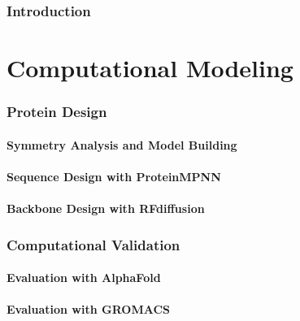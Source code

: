 \documentclass[12pt]{article}
\begin{document}
\tableofcontents
\clearpage

\section{Introduction}\label{ch:introduction}

\FloatBarrier

% 
\clearpage
\part{Computational Modeling}
\section{Protein Design}
\subsection{Symmetry Analysis and Model Building}\label{ch:symmetry}

\FloatBarrier

\subsection{Sequence Design with ProteinMPNN}\label{ch:pmpnn}

\FloatBarrier

\subsection{Backbone Design with RFdiffusion}\label{ch:rfdiffusion}

\FloatBarrier

\section{Computational Validation}
\subsection{Evaluation with AlphaFold}\label{ch:alphafold}

\FloatBarrier

\subsection{Evaluation with GROMACS}\label{ch:gromacs}

\FloatBarrier
\end{document}
